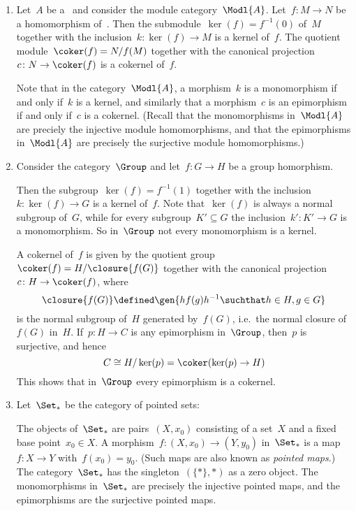\begin{example}
  \leavevmode
  \begin{enumerate}
    \item
      Let~$A$ be a~{\kalg} and consider the module category~$\Modl{A}$.
      Let~$f \colon M \to N$ be a homomorphism of~{}.
      Then the submodule~$\ker(f) = f^{-1}(0)$ of~$M$ together with the inclusion~$k \colon \ker(f) \to M$ is a kernel of~$f$.
      The quotient module~$\coker(f) = N/f(M)$ together with the canonical projection~$c \colon N \to \coker(f)$ is a cokernel of~$f$.
      
      Note that in the category~$\Modl{A}$, a morphism~$k$ is a monomorphism if and only if~$k$ is a kernel, and similarly that a morphism~$c$ is an epimorphism if and only if~$c$ is a cokernel.
      (Recall that the monomorphisms in~$\Modl{A}$ are preciely the injective module homomorphisms, and that the epimorphisms in~$\Modl{A}$ are precisely the surjective module homomorphisms.)
    \item
      Consider the category~$\Group$ and let~$f \colon G \to H$ be a group homorphism.
      
      Then the subgroup~$\ker(f) = f^{-1}(1)$ together with the inclusion~$k \colon \ker(f) \to G$ is a kernel of~$f$.
      Note that~$\ker(f)$ is always a normal subgroup of~$G$, while for every subgroup~$K' \subseteq G$ the inclusion~$k' \colon K' \to G$ is a monomorphism.
      So in~$\Group$ not every monomorphism is a kernel.
      
      A cokernel of~$f$ is given by the quotient group~$\coker(f) = H/\closure{f(G)}$ together with the canonical projection~$c \colon H \to \coker(f)$, where
      \[
                  \closure{f(G)}
        \defined  \gen{
                    h f(g) h^{-1}
                  \suchthat
                    h \in H, g \in G
                  }
      \]
      is the normal subgroup of~$H$ generated by~$f(G)$, i.e.\ the normal closure of~$f(G)$ in~$H$.
      If~$p \colon H \to C$ is any epimorphism in~$\Group$, then~$p$ is surjective, and hence
      \[
              C
        \cong H/\ker(p)
        =     \coker(\ker(p) \to H)
      \]
      This shows that in~$\Group$ every epimorphism is a cokernel.
    \item
      Let~$\Set_*$ be the category of pointed sets:
      
      The objects of~$\Set_*$ are pairs~$(X,x_0)$ consisting of a set~$X$ and a fixed base point~$x_0 \in X$.
      A morphism~$f \colon (X,x_0) \to (Y,y_0)$ in~$\Set_*$ is a map~$f \colon X \to Y$ with~$f(x_0) = y_0$.
      (Such maps are also known as \emph{pointed maps}.)
      The category~$\Set_*$ has the singleton~$(\{\ast\}, \ast)$ as a zero object.
      The monomorphisms in~$\Set_*$ are precisely the injective pointed maps, and the epimorphisms are the surjective pointed maps.
      

\end{enumerate}
\end{example}
